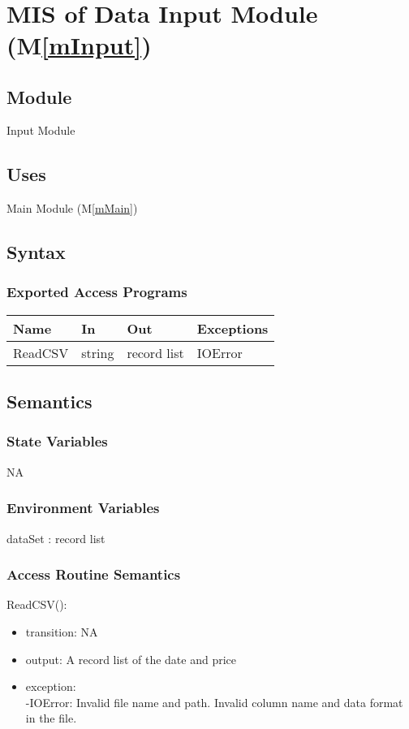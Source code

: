 \documentclass[12pt, titlepage]{article}
\newcommand{\mref}[1]{M\ref{#1}}
\begin{document}
~\newpage

\section{MIS of Data Input Module (\mref{mInput}) } 

\subsection{Module}
Input Module
\subsection{Uses}
Main Module (\mref{mMain})
\subsection{Syntax}

\subsubsection{Exported Access Programs}

\begin{center}
\begin{tabular}{p{2cm} p{4cm} p{4cm} p{2cm}}
\hline
\textbf{Name} & \textbf{In} & \textbf{Out} & \textbf{Exceptions} \\
\hline

ReadCSV & string & record list & IOError \\
\hline
\end{tabular}
\end{center}


\subsection{Semantics}
\subsubsection{State Variables}
NA
\subsubsection{Environment Variables}
dataSet : record list
\subsubsection{Access Routine Semantics}

\noindent ReadCSV():
\begin{itemize}
\item transition: NA
\item output: A record list of the date and price 
\item exception: \\
-IOError: Invalid file name and path. Invalid column name and data format
in the file. 
\end{itemize}
\end{document}

